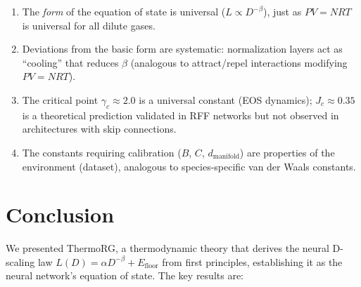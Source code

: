 \documentclass[11pt, a4paper]{article}
\theoremstyle{plain}
\begin{document}
\begin{enumerate}
\item The \emph{form} of the equation of state is universal ($L \propto D^{-\beta}$), just as $PV = NRT$ is universal for all dilute gases.

\item Deviations from the basic form are systematic: normalization layers act as ``cooling'' that reduces $\beta$ (analogous to attract/repel interactions modifying $PV = NRT$).

\item The critical point $\gamma_c \approx 2.0$ is a universal constant (EOS dynamics); $J_c \approx 0.35$ is a theoretical prediction validated in RFF networks but not observed in architectures with skip connections.

\item The constants requiring calibration ($B$, $C$, $d_{\mathrm{manifold}}$) are properties of the environment (dataset), analogous to species-specific van der Waals constants.
\end{enumerate}

\section{Conclusion}

We presented ThermoRG, a thermodynamic theory that derives the neural D-scaling law $L(D) = \alpha D^{-\beta} + E_{\mathrm{floor}}$ from first principles, establishing it as the neural network's equation of state. The key results are:
\end{document}
